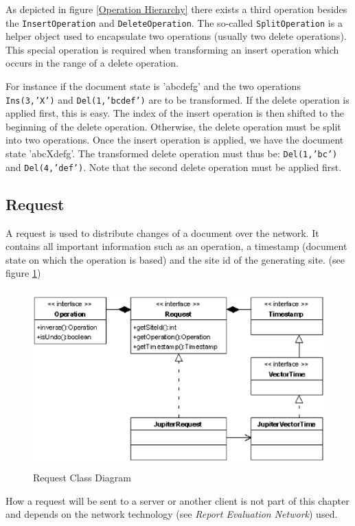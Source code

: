 \label{Split_Operation}
As depicted in figure \ref{Operation Hierarchy} there exists a third operation besides the \texttt{InsertOperation} and \texttt{DeleteOperation}. The so-called \texttt{SplitOperation} is a helper object used to encapsulate two operations (usually two delete operations). This special operation is required when transforming an insert operation which occurs in the range of a delete operation. 

For instance if the document state is 'abcdefg' and the two operations
\texttt{Ins(3,'X')} and \texttt{Del(1,'bcdef')} are to be transformed. If
the delete operation is applied first, this is easy. The index of the insert
operation is then shifted to the beginning of the delete operation. Otherwise,
the delete operation must be split into two operations. Once the insert
operation is applied, we have the document state 'abcXdefg'. The transformed
delete operation must thus be: \texttt{Del(1,'bc')} and \texttt{Del(4,'def')}.
Note that the second delete operation must be applied first.


\subsection{Request}
A request is used to distribute changes of a document over the network. It 
contains all important information such as an operation, a timestamp (document 
state on which the operation is based) and the site id of the generating site. 
(see figure \ref{Request Class Diagram})

\begin{figure}[H]
\centering
\includegraphics[height=6.87cm,width=12.09cm]{../images/finalreport/algorithm_request.eps}
\caption{Request Class Diagram}
\label{Request Class Diagram}
\end{figure}

How a request will be sent to a server or another client is not part of this chapter and depends on the network technology (see \emph{Report Evaluation Network}) used.


